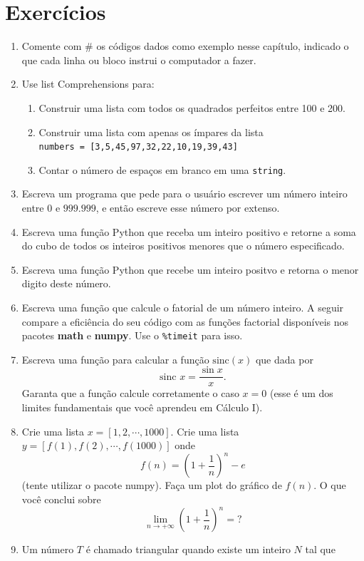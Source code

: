 \section{Exercícios}
\begin{enumerate}
    \item Comente com $\#$ os códigos dados como exemplo nesse capítulo, indicado o que cada linha ou bloco instrui o computador a fazer.
    \item Use list Comprehensions para:
    \begin{enumerate}
        \item Construir uma lista com todos os quadrados perfeitos entre 100 e 200.
        \item Construir uma lista com apenas os ímpares da lista \\{\tt numbers = [3,5,45,97,32,22,10,19,39,43]}
        \item Contar o número de espaços em branco em uma {\tt string}.
    \end{enumerate}
    \item Escreva um programa que pede para o usuário escrever um número inteiro entre $0$ e $999.999$, e então escreve esse número por extenso.
    \item Escreva uma função Python que receba um inteiro positivo e retorne a soma do cubo de todos os inteiros positivos menores que o número especificado.
    \item Escreva uma função Python que recebe um inteiro positvo e retorna o menor digito deste número.
    \item Escreva uma função que calcule o fatorial de um número inteiro. A seguir compare a eficiência do seu código com as funções factorial disponíveis nos pacotes {\bf math} e {\bf numpy}. Use o {\tt \%timeit} para isso.
    \item Escreva uma função para calcular a função $\text{sinc}(x)$ que dada por
    \[ \text{sinc } x = \frac{\sin x}{x}.\]
    Garanta que a função calcule corretamente o caso $x=0$ (esse é um dos limites fundamentais que você aprendeu em Cálculo I).
    \item Crie uma lista $x=[1,2,\cdots,1000]$. Crie uma lista $y=[f(1), f(2), \cdots, f(1000)]$ onde 
    \[ f(n) = \left(1 + \frac{1}{n}\right)^n - e\]
    (tente utilizar o pacote numpy). Faça um plot do gráfico de $f(n)$. O que você conclui sobre
    \[ \lim_{n \rightarrow + \infty} \left(1 + \frac{1}{n}\right)^n = ? \]
    \item Um número $T$ é chamado triangular quando existe um inteiro $N$ tal que

\end{enumerate}
